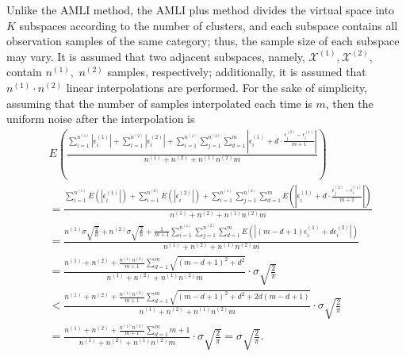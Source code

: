 \documentclass[mathematics,article,accept,pdftex,moreauthors]{Definitions/mdpi}
\begin{document}
Unlike the AMLI method, the AMLI plus method divides the virtual space into $K$ subspaces according to the number of clusters, and each subspace contains all observation samples of the same category; thus, the sample size of each subspace may vary. It is assumed that two adjacent subspaces, namely, $\mathcal{X}^{(1)}, \mathcal{X}^{(2)} $, contain $n^{(1)},$ $n^{(2)}$ samples, respectively; additionally, it is assumed that $n^{(1)} \cdot n^{(2)}$ linear interpolations are performed. For the sake of simplicity, assuming that the number of samples interpolated each time is $m$, then the uniform noise after the interpolation is
\begin{equation*}
\begin{split}
	& E(\frac{\sum_{i=1}^{n^{(1)}}|\epsilon_{i}^{(1)}| + \sum_{i=1}^{n^{(2)}}|\epsilon_{i}^{(2)}| + \sum_{i=1}^{n^{(1)}}\sum_{j=1}^{n^{(2)}}\sum_{d=1}^{m} \left|\epsilon_{i}^{(1)} + d \cdot \frac{ \epsilon_{j}^{(2)} - \epsilon_{i}^{(1)} }{m+1}  \right|
	}
	{n^{(1)}+n^{(2)}+n^{(1)}n^{(2)}m}) \\ 
	& =  	\frac{\sum_{i=1}^{n^{(1)}} E(|\epsilon_{i}^{(1)}|) + \sum_{i=1}^{n^{(2)}} E(|\epsilon_{i}^{(2)}|) + \sum_{i=1}^{n^{(1)}}\sum_{j=1}^{n^{(2)}}\sum_{d=1}^{m} E(\left|\epsilon_{i}^{(1)} + d \cdot \frac{ \epsilon_{j}^{(2)} - \epsilon_{i}^{(1)} }{m+1}  \right|)
	}
	{n^{(1)}+n^{(2)}+n^{(1)}n^{(2)}m} \\
	& = 	\frac {n^{(1)}\sigma \sqrt{\frac{2}{n}} + n^{(2)}\sigma\sqrt{\frac{2}{n}} + \frac{1}{m+1}\sum_{i=1}^{n^{(1)}}\sum_{j=1}^{n^{(2)}}\sum_{d=1}^{m} E(\left|(m - d +1)\epsilon_{i}^{(1)} + d   \epsilon_{i}^{(2)}   \right|)
    }
	{n^{(1)}+n^{(2)}+n^{(1)}n^{(2)}m}	\\
	& = 	\frac {n^{(1)} + n^{(2)} + \frac{n^{(1)}n^{(2)}}{m+1}    \sum_{d=1}^{m} \sqrt{(m-d+1)^{2} + d^{2}}
	}
	{n^{(1)}+n^{(2)}+n^{(1)}n^{(2)}m} \cdot \sigma \sqrt{\frac{2}{\pi}} \\
	& < \frac {n^{(1)} + n^{(2)} + \frac{n^{(1)}n^{(2)}}{m+1}    \sum_{d=1}^{m} \sqrt{(m-d+1)^{2} + d^{2} +2d(m-d+1)}
	}
	{n^{(1)}+n^{(2)}+n^{(1)}n^{(2)}m} \cdot \sigma \sqrt{\frac{2}{\pi}}
	 \\
	& = \frac {n^{(1)} + n^{(2)} + \frac{n^{(1)}n^{(2)}}{m+1}    \sum_{d=1}^{m} m+1
	}
	{n^{(1)}+n^{(2)}+n^{(1)}n^{(2)}m} \cdot \sigma \sqrt{\frac{2}{\pi}}
	 = \sigma \sqrt{\frac{2}{\pi}}.
\end{split}
\end{equation*}
\end{document}
